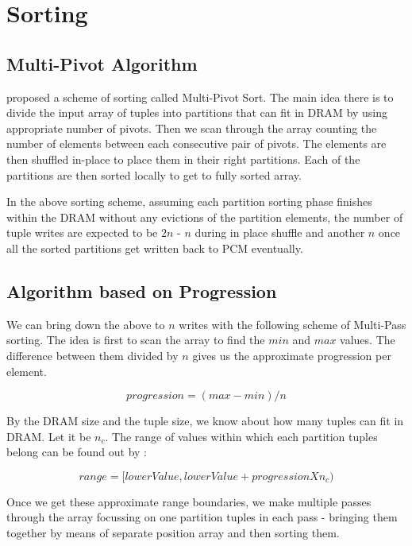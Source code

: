 \chapter{Sorting}
\label{sort}

\section{Multi-Pivot Algorithm}
\cite{abhimanyu} proposed a scheme of sorting called Multi-Pivot Sort. The main idea there is to divide the input array of tuples into partitions that can fit in DRAM by using appropriate number of pivots. Then we scan through the array counting the number of elements between each consecutive pair of pivots. The elements are then shuffled in-place to place them in their right partitions. Each of the partitions are then sorted locally to get to fully sorted array.

In the above sorting scheme, assuming each partition sorting phase finishes within the DRAM without any evictions of the partition elements, the number of tuple writes are expected to be $2n$ - $n$ during in place shuffle and another $n$ once all the sorted partitions get written back to PCM eventually.

\section{Algorithm based on Progression}
We can bring down the above to $n$ writes with the following scheme of Multi-Pass sorting. The idea is first to scan the array to find the $min$ and $max$ values. The difference between them divided by $n$ gives us the approximate progression per element.

$$progression = (max - min)/n$$

By the DRAM size and the tuple size, we know about how many tuples can fit in DRAM. Let it be $n_c$. The range of values within which each partition tuples belong can be found out by :

$$range = [lowerValue, lowerValue + progression X n_c)$$

Once we get these approximate range boundaries, we make multiple passes through the array focussing on one partition tuples in each pass - bringing them together by means of separate position array and then sorting them.  

